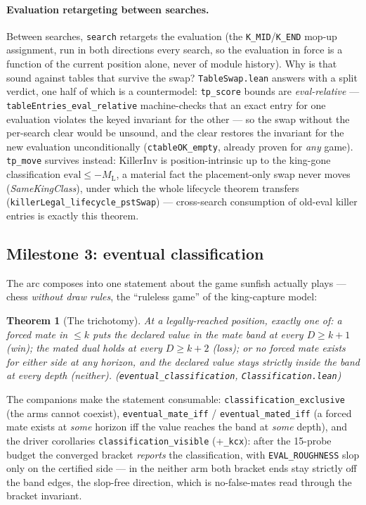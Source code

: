 \documentclass[11pt]{article}
\newcommand{\ML}{M_{\mathrm{L}}}    %
\newcommand{\leanref}[2]{(\texttt{#1}, \texttt{#2})}%
\theoremstyle{plain}
\newtheorem{theorem}{Theorem}[section]
\theoremstyle{definition}
\theoremstyle{remark}
\begin{document}
\paragraph{Evaluation retargeting between searches.}
\label{sec:tableswap}
Between searches, \texttt{search} retargets the evaluation (the
\texttt{K\_MID}/\texttt{K\_END} mop-up assignment, run in both
directions every search, so the evaluation in force is a function of
the current position alone, never of module history).  Why is that
sound against tables that survive the swap?  \texttt{TableSwap.lean}
answers with a split verdict, one half of which is a countermodel:
\texttt{tp\_score} bounds are \emph{eval-relative} ---
\texttt{tableEntries\_eval\_relative} machine-checks that an exact
entry for one evaluation violates the keyed invariant for the other
--- so the swap without the per-search clear would be unsound, and the
clear restores the invariant for the new evaluation unconditionally
(\texttt{ctableOK\_empty}, already proven for \emph{any} game).
\texttt{tp\_move} survives instead: $\mathrm{KillerInv}$ is
position-intrinsic up to the king-gone classification
$\mathrm{eval} \le -\ML$, a material fact the placement-only swap
never moves (\emph{SameKingClass}), under which the whole lifecycle
theorem transfers (\texttt{killerLegal\_lifecycle\_pstSwap}) ---
cross-search consumption of old-eval killer entries is exactly this
theorem.

\subsection{Milestone 3: eventual classification}

The arc composes into one statement about the game sunfish actually
plays --- chess \emph{without draw rules}, the ``ruleless game'' of
the king-capture model:

\begin{theorem}[The trichotomy]
\label{thm:trichotomy}
At a legally-reached position, exactly one of: a forced mate in $\le k$
puts the declared value in the mate band at every $D \ge k+1$
(\emph{win}); the mated dual holds at every $D \ge k+2$ (\emph{loss});
or no forced mate exists for either side at any horizon, and the
declared value stays \emph{strictly} inside the band at every depth
(\emph{neither}).
\leanref{eventual\_classification}{Classification.lean}
\end{theorem}

The companions make the statement consumable:
\texttt{classification\_exclusive} (the arms cannot coexist),
\texttt{eventual\_mate\_iff} / \texttt{eventual\_mated\_iff} (a forced
mate exists at \emph{some} horizon iff the value reaches the band at
\emph{some} depth), and the driver corollaries
\texttt{classification\_visible} (+\texttt{\_kcx}): after the 15-probe
budget the converged bracket \emph{reports} the classification, with
\texttt{EVAL\_ROUGHNESS} slop only on the certified side --- in the
neither arm both bracket ends stay strictly off the band edges, the
slop-free direction, which is no-false-mates read through the bracket
invariant.
\end{document}
